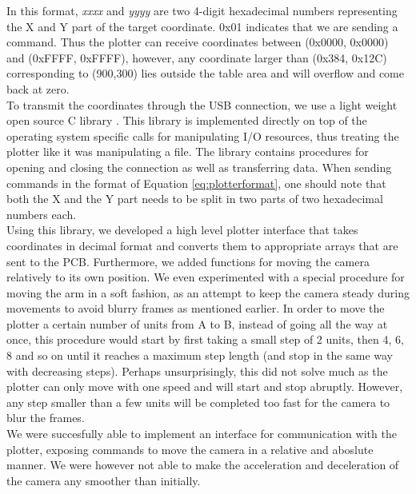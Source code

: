 In this format, \textit{xxxx} and \textit{yyyy} are two 4-digit hexadecimal numbers representing the X and Y part of the target coordinate. 0x01 indicates that we are sending a command. Thus the plotter can receive coordinates between (0x0000, 0x0000) and (0xFFFF, 0xFFFF), however, any coordinate larger than (0x384, 0x12C) corresponding to (900,300) lies outside the table area and will overflow and come back at zero. \\

To transmit the coordinates through the USB connection, we use a light weight open source C library \cite{rs232}. This library is implemented directly on top of the operating system specific calls for manipulating I/O resources, thus treating the plotter like it was manipulating a file. The library contains procedures for opening and closing the connection as well as transferring data. When sending commands in the format of Equation \ref{eq:plotterformat}, one should note that both the X and the Y part needs to be split in two parts of two hexadecimal numbers each. \\

Using this library, we developed a high level plotter interface that takes coordinates in decimal format and converts them to appropriate arrays that are sent to the PCB. Furthermore, we added functions for moving the camera relatively to its own position. We even experimented with a special procedure for moving the arm in a soft fashion, as an attempt to keep the camera steady during movements to avoid blurry frames as mentioned earlier. In order to move the plotter a certain number of units from A to B, instead of going all the way at once, this procedure would start by first taking a small step of 2 units, then 4, 6, 8 and so on until it reaches a maximum step length (and stop in the same way with decreasing steps). Perhaps unsurprisingly, this did not solve much as the plotter can only move with one speed and will start and stop abruptly. However, any step smaller than a few units will be completed too fast for the camera to blur the frames. \\

We were succesfully able to implement an interface for communication with the plotter, exposing commands to move the camera in a relative and aboslute manner. We were however not able to make the acceleration and deceleration of the camera any smoother than initially.

